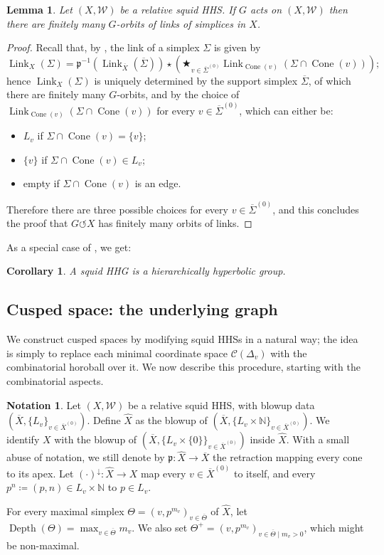 \documentclass[svgnames]{amsart}
\theoremstyle{plain}
\newtheorem{lem}[thm]{Lemma}
\newtheorem{cor}[thm]{Corollary}
\theoremstyle{definition}
\newtheorem{notation}[thm]{Notation}
\newcommand{\C}[1]{\mathcal{C}(#1)}
\newcommand{\link}[2]{\operatorname{Link}_{#1}\left(#2\right)}
\newcommand{\W}{\mathcal{W}}
\newcommand{\p}{\mathfrak{p}}
\newcommand{\Cone}[1]{\operatorname{Cone}\left(#1\right)}
\newcommand{\depth}[1]{\operatorname{Depth}\left(#1\right)}
\newcommand{\down}[1]{{#1}^{\downarrow}}
\newcommand{\squid}[1]{squid}
\newcommand{\N}{\mathbb{N}}
\renewcommand{\hat}{\widehat}
\newcommand{\ov}[1]{\overline{#1}}
\begin{document}
\begin{lem}\label{lem:finman_orbit_of_lk} Let $(X,\W)$ be a relative \squid{} HHS. If $G$ acts on $(X,\W)$ then there are finitely many $G$-orbits of links of simplices in $X$.
\end{lem}
\begin{proof}
     Recall that, by , the link of a simplex $\Sigma$ is given by
    $$\link{X}{\Sigma}=\p^{-1}\left(\link{\ov X}{\ov \Sigma}\right)\star \left(\bigstar_{v\in\ov\Sigma^{(0)}}\link{\Cone{v}}{\Sigma\cap\Cone{v}}\right);$$
    hence $\link{X}{\Sigma}$ is uniquely determined by the support simplex $\ov\Sigma$, of which there are finitely many $G$-orbits, and by the choice of $\link{\Cone{v}}{\Sigma\cap\Cone{v}}$ for every ${v\in\ov\Sigma^{(0)}}$, which can either be:
    \begin{itemize}
        \item $L_v$ if $\Sigma\cap\Cone{v}=\{v\}$;
        \item $\{v\}$ if $\Sigma\cap\Cone{v}\in L_v$;
        \item empty if $\Sigma\cap\Cone{v}$ is an edge.
    \end{itemize}
    Therefore there are three possible choices for every ${v\in\ov\Sigma^{(0)}}$, and this concludes the proof that $G\circlearrowleft X$ has finitely many orbits of links.
\end{proof}


\noindent As a special case of {\cite[Theorem 1.18]{BHMS}}, we get:
\begin{cor}
    A \squid{} HHG is a hierarchically hyperbolic group.
\end{cor}


\subsection{Cusped space: the underlying graph}

We construct cusped spaces by modifying \squid{} HHSs in a natural way; the idea is simply to replace each minimal coordinate space $\C{\Delta_v}$ with the combinatorial horoball over it. We now describe this procedure, starting with the combinatorial aspects.


\begin{notation}\label{notation:pre_cusp}
Let $(X,\W)$ be a relative \squid{} HHS, with blowup data $(\ov X, \{L_v\}_{v\in \ov X^{(0)}})$. Define $\hat X$ as the blowup of $(\ov X, \{L_v\times \N\}_{v\in \ov X^{(0)}})$. We identify $X$ with the blowup of $(\ov X, \{L_v\times \{0\}\}_{v\in \ov X^{(0)}})$ inside $\hat X$. With a small abuse of notation, we still denote by $\p\colon \hat X\to \ov X$ the retraction mapping every cone to its apex. Let $\down{(\cdot)}\colon \hat X\to X$ map every $v\in \ov X^{(0)}$ to itself, and every $p^n\coloneq (p,n)\in L_v\times \N$ to $p\in L_v$. 

For every maximal simplex $\Theta=(v,{p}^{m_v})_{v\in \ov\Theta}$ of $\hat X$, let $\depth{\Theta}=\max_{v\in \ov\Theta} m_v$. We also set $\Theta^+=(v,{p}^{m_v})_{v\in \ov\Theta\mid m_v>0}$, which might be non-maximal.
\end{notation}
\end{document}
